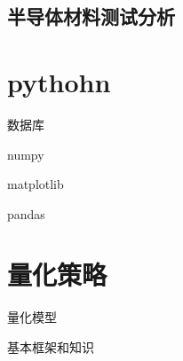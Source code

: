\subsection{半导体材料测试分析}


\section{pythohn}
数据库

numpy

matplotlib

pandas


\section{量化策略}
量化模型

基本框架和知识




%
